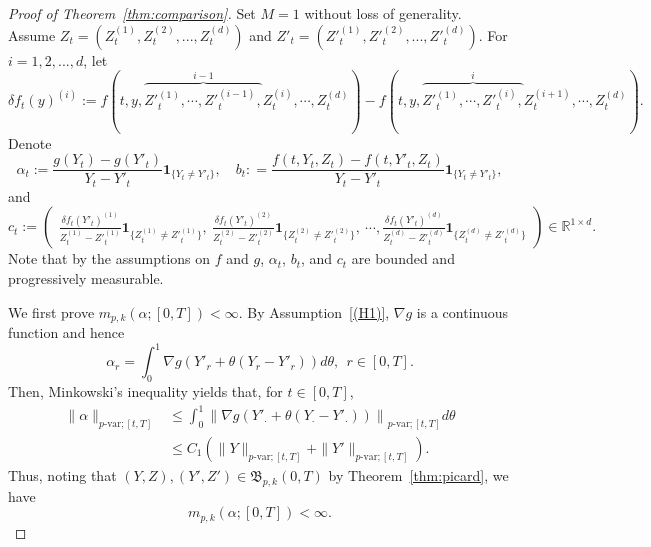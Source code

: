 \documentclass[11pt,reqno]{amsart}
\numberwithin{equation}{section}
\begin{document}
\begin{proof}[Proof of Theorem~\ref{thm:comparison}]
\makeatletter{}\makeatother\label{proof:2}
Set $M=1$ without loss of generality. Assume $Z_t = (Z^{(1)}_t,Z^{(2)}_t,...,Z^{(d)}_t)$ and $Z'_{t} = (Z'^{(1)}_t,Z'^{(2)}_t,...,Z'^{(d)}_t)$. 
For $i=1,2,...,d$, let
\[\delta f_{t}(y)^{(i)}:= f(t,y,\overbrace{Z'^{(1)}_t,\cdots,Z'^{(i-1)}_t,}^{i-1}Z^{(i)}_t,\cdots, Z^{(d)}_t) - f(t,y,\overbrace{Z'^{(1)}_t,\cdots,Z'^{(i)}_t,}^{i}Z^{(i+1)}_t,\cdots, Z^{(d)}_t).\]
Denote
\[\alpha_{t} := \frac{g(Y_{t})-g(Y'_{t})}{Y_{t}-Y'_{t}}\mathbf 1_{\{Y_t\neq Y'_t\}},\quad b_{t}: = \frac{f(t,Y_t,Z_t) - f(t,Y'_t,Z_t)}{Y_{t} - Y'_{t}} \mathbf 1_{\{Y_t\neq Y'_t\}},\] 
and
\begin{equation*}
c_{t} := \begin{pmatrix}
\frac{\delta f_{t}(Y'_t)^{(1)}}{Z^{(1)}_{t} - Z'^{(1)}_t}\mathbf 1_{\{Z^{(1)}_t\neq Z'^{(1)}_t\}},\ \frac{\delta f_{t}(Y'_t)^{(2)}}{Z^{(2)}_{t} - Z'^{(2)}_t}\mathbf 1_{\{Z^{(2)}_t\neq Z'^{(2)}_t\}},\ \cdots,\frac{\delta f_{t}(Y'_t)^{(d)}}{Z^{(d)}_{t} - Z'^{(d)}_t}\mathbf 1_{\{Z^{(d)}_t\neq Z'^{(d)}_t\}}
\end{pmatrix}\in \mathbb{R}^{1\times d}.
\end{equation*}
Note that by the assumptions on $f$ and $g$,  $\alpha_t$, $b_t$, and $c_t$ are bounded and progressively measurable.

We first prove $m_{p,k}(\alpha;[0,T])<\infty$. By Assumption~\ref{(H1)}, $\nabla g$ is a continuous function and hence 
\begin{equation*}
\alpha_{r} = \int_{0}^{1}\nabla g\left(Y'_{r}+\theta(Y_{r}-Y'_{r})\right)d\theta, ~~r\in[0,T].
\end{equation*}
Then, Minkowski's inequality yields that, for $t\in [0,T]$, 
\begin{equation}\label{e:estimate-alpha-p-var}
\begin{aligned}
\|\alpha\|_{p\text{-var};[t,T]}&\le \int_{0}^{1}\left\|\nabla g\left(Y'_{\cdot}+\theta(Y_{\cdot}-Y'_{\cdot})\right)\right\|_{p\text{-var};[t,T]}d\theta\\
&\le C_{1}\left(\|Y\|_{p\text{-var};[t,T]}+\|Y'\|_{p\text{-var};[t,T]}\right).
\end{aligned}
\end{equation}
Thus,  noting that $(Y,Z),(Y',Z')\in \mathfrak B_{p,k}(0,T)$ by Theorem~\ref{thm:picard},  we have 
\begin{equation}\label{e:mpk-finite}
m_{p,k}(\alpha;[0,T])<\infty.
\end{equation} 			


\end{proof}
\end{document}

